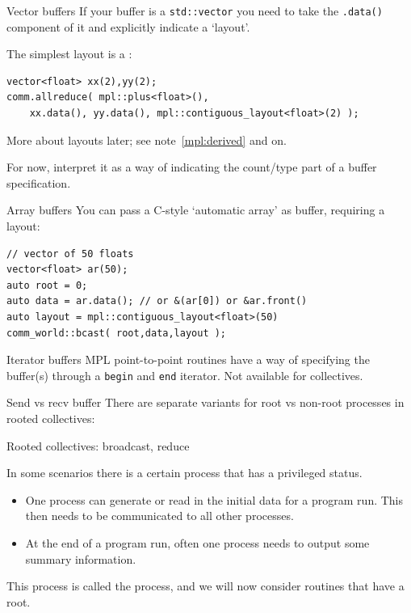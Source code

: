 \begin{mplnote}{Vector buffers}
  \label{mpl:vec-buf}
If your buffer is a \lstinline+std::vector+ you need
to take the \lstinline+.data()+ component of it
and explicitly indicate a `layout'.

The simplest layout is a :
\begin{lstlisting}
vector<float> xx(2),yy(2);
comm.allreduce( mpl::plus<float>(),
    xx.data(), yy.data(), mpl::contiguous_layout<float>(2) );
\end{lstlisting}

More about layouts later; 
see note~\ref{mpl:derived} and on.

For now, interpret it as a way of indicating the count/type
part of a buffer specification.
\end{mplnote}

\begin{mplnote}{Array buffers}
  \label{mpl:vec-arr}
  You can pass a C-style `automatic array' as buffer, requiring a layout:
\begin{lstlisting}
// vector of 50 floats
vector<float> ar(50);
auto root = 0;
auto data = ar.data(); // or &(ar[0]) or &ar.front()
auto layout = mpl::contiguous_layout<float>(50)
comm_world::bcast( root,data,layout );
\end{lstlisting}
\end{mplnote}

\begin{mplnote}{Iterator buffers}
  \label{mpl:buf-itr}
  MPL point-to-point routines have a way of specifying the buffer(s)
  through a \lstinline{begin} and \lstinline{end} iterator.
  Not available for collectives.
\end{mplnote}

\begin{mplnote}{Send vs recv buffer}
  There are separate variants for root vs non-root processes
  in rooted collectives:
\end{mplnote}

 {Rooted collectives: broadcast, reduce}
\label{sec:rooted}

In some scenarios there is a certain process that has a privileged status.
\begin{itemize}
\item
  One process can generate or read in the initial data for a program
  run. This then needs to be communicated to all other processes.
\item
  At the end of a program run, often
  one process needs to output some summary information.
\end{itemize}
This process is called the  process, and we will now
consider routines that have a root.

